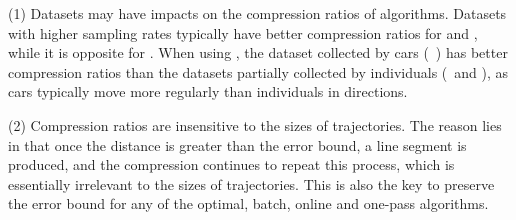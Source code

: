 \sstab(1)  {Datasets may have impacts on the compression ratios of \lsa algorithms. Datasets with higher sampling rates typically have better compression ratios for \ped and \sed, while it is opposite for \dad. {When using \dad, the} dataset collected by cars (\eg~\ucar) has better compression ratios than the datasets partially collected by individuals (\eg~\geolife and \mopsi), as cars typically move more regularly than individuals {in directions}.}

\sstab(2) {Compression ratios are insensitive to the sizes of trajectories.} {The reason lies in that once the distance is greater than the error bound, a line segment is produced, and the compression continues to repeat this process, which is essentially irrelevant to the sizes of trajectories. This is also the key to preserve the error bound for any of the optimal, batch, online and one-pass algorithms.}

